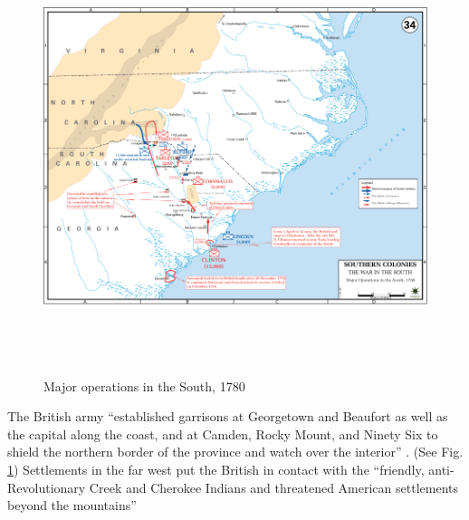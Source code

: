 \begin{figure}[ht]
\begin{center}
\includegraphics[height=5in]{gfx/Nicholson3}
\end{center}
\caption{Major operations in the South, 1780 \cite[Map 34]{web:USMA:map34}}
\label{Nicholson3}
\end{figure}

The British army “established garrisons at Georgetown and Beaufort as well as
the capital along the coast, and at Camden, Rocky Mount, and Ninety Six to
shield the northern border of the province and watch over the interior”
\cite[p.10]{weigley_partisan_1970}.  (See Fig. \ref{Nicholson3}) Settlements in
the far west put the British in contact with the “friendly, anti-Revolutionary
Creek and Cherokee Indians and threatened American settlements beyond the
mountains” \cite[p.10]{weigley_partisan_1970}


